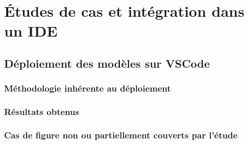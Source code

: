 \chapter{Études de cas et intégration dans un IDE}
    \section{Déploiement des modèles sur VSCode}
        \subsection{Méthodologie inhérente au déploiement}
        \subsection{Résultats obtenus}
        \subsection{Cas de figure non ou partiellement couverts par l'étude}